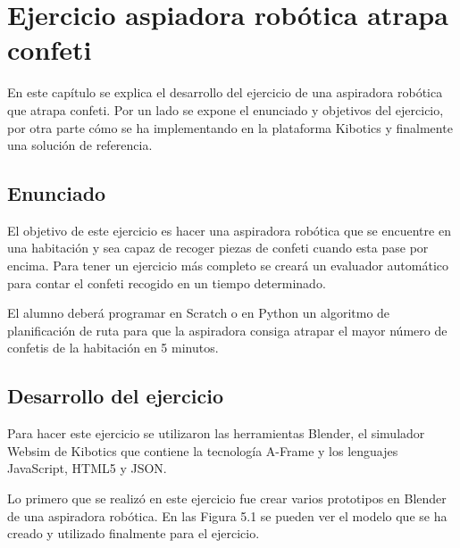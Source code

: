 \chapter{Ejercicio aspiadora robótica atrapa confeti}\label{chap:aspiradora}
En este capítulo se explica el desarrollo del ejercicio de una aspiradora robótica que atrapa confeti. Por un lado se expone el enunciado y objetivos del ejercicio, por otra parte cómo se ha implementando en la plataforma Kibotics y finalmente una solución de referencia.


\section{Enunciado}
El objetivo de este ejercicio es hacer una aspiradora robótica que se encuentre en una habitación y sea capaz de recoger piezas de confeti cuando esta pase por encima. Para tener un ejercicio más completo se creará un evaluador automático para contar el confeti recogido en un tiempo determinado.

El alumno deberá programar en Scratch o en Python un algoritmo de planificación de ruta para que la aspiradora consiga atrapar el mayor número de confetis de la habitación en 5 minutos.

\section{Desarrollo del ejercicio}
Para hacer este ejercicio se utilizaron las herramientas Blender, el simulador Websim de Kibotics que contiene la tecnología A-Frame y los lenguajes JavaScript, HTML5 y JSON.

Lo primero que se realizó en este ejercicio fue crear varios prototipos en Blender de una aspiradora robótica. En las Figura 5.1 se pueden ver el modelo que se ha creado y utilizado finalmente para el ejercicio.
 
